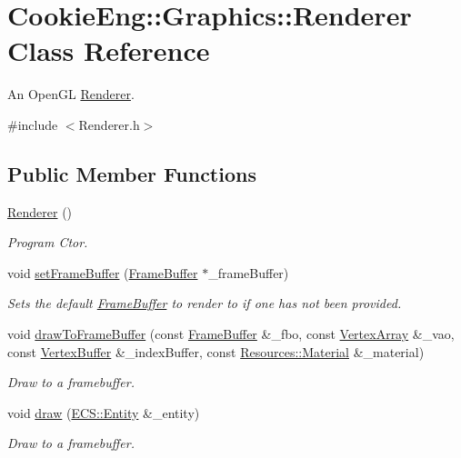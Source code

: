 \hypertarget{class_cookie_eng_1_1_graphics_1_1_renderer}{}\section{Cookie\+Eng\+:\+:Graphics\+:\+:Renderer Class Reference}
\label{class_cookie_eng_1_1_graphics_1_1_renderer}


An Open\+GL \hyperlink{class_cookie_eng_1_1_graphics_1_1_renderer}{Renderer}.  




{\ttfamily \#include $<$Renderer.\+h$>$}

\subsection*{Public Member Functions}
\begin{DoxyCompactItemize}
\item 
\hyperlink{class_cookie_eng_1_1_graphics_1_1_renderer_a255e78964e0d0ff7efd26e60a6612f39}{Renderer} ()
\begin{DoxyCompactList}\small\item\em Program Ctor. \end{DoxyCompactList}\item 
void \hyperlink{class_cookie_eng_1_1_graphics_1_1_renderer_a9e8bce3cb731b1f09ca5bc4bc863414b}{set\+Frame\+Buffer} (\hyperlink{class_cookie_eng_1_1_graphics_1_1_frame_buffer}{Frame\+Buffer} $\ast$\+\_\+frame\+Buffer)
\begin{DoxyCompactList}\small\item\em Sets the default \hyperlink{class_cookie_eng_1_1_graphics_1_1_frame_buffer}{Frame\+Buffer} to render to if one has not been provided. \end{DoxyCompactList}\item 
void \hyperlink{class_cookie_eng_1_1_graphics_1_1_renderer_aa32e62971f191a434ab457f9ac84ac31}{draw\+To\+Frame\+Buffer} (const \hyperlink{class_cookie_eng_1_1_graphics_1_1_frame_buffer}{Frame\+Buffer} \&\+\_\+fbo, const \hyperlink{class_cookie_eng_1_1_graphics_1_1_vertex_array}{Vertex\+Array} \&\+\_\+vao, const \hyperlink{class_cookie_eng_1_1_graphics_1_1_vertex_buffer}{Vertex\+Buffer} \&\+\_\+index\+Buffer, const \hyperlink{class_cookie_eng_1_1_resources_1_1_material}{Resources\+::\+Material} \&\+\_\+material)
\begin{DoxyCompactList}\small\item\em Draw to a framebuffer. \end{DoxyCompactList}\item 
void \hyperlink{class_cookie_eng_1_1_graphics_1_1_renderer_a5cadfbd80259f0188e52880c47ac7573}{draw} (\hyperlink{class_cookie_eng_1_1_e_c_s_1_1_entity}{E\+C\+S\+::\+Entity} \&\+\_\+entity)
\begin{DoxyCompactList}\small\item\em Draw to a framebuffer. \end{DoxyCompactList}\end{DoxyCompactItemize}
